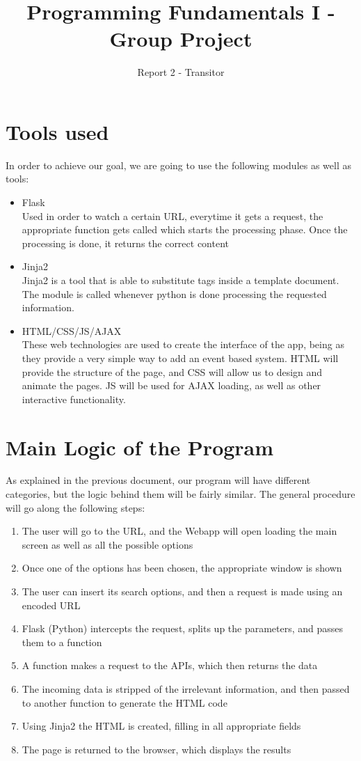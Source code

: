 \documentclass[a4paper]{article}
\title{Programming Fundamentals I - Group Project}
\author{Report 2 - Transitor}
\begin{document}
\maketitle
\section{Tools used}
In order to achieve our goal, we are going to use the following modules as well as tools:
\begin{itemize}
\item Flask\\
Used in order to watch a certain URL, everytime it gets a request, the appropriate function gets called which starts the processing phase. Once the processing is done, it returns the correct content
\item Jinja2\\
Jinja2 is a tool that is able to substitute tags inside a template document. The module is called whenever python is done processing the requested information.
\item HTML/CSS/JS/AJAX\\
These web technologies are used to create the interface of the app, being as they provide a very simple way to add an event based system. HTML will provide the structure of the page, and CSS will allow us to design and animate the pages. JS will be used for AJAX loading, as well as other interactive functionality. 
\end{itemize}


\section{Main Logic of the Program}
As explained in the previous document, our program will have different categories, but the logic behind them will be fairly similar. The general procedure will go along the following steps:
\begin{enumerate}
\item The user will go to the URL, and the Webapp will open loading the main screen as well as all the possible options
\item Once one of the options has been chosen, the appropriate window is shown
\item The user can insert its search options, and then a request is made using an encoded URL
\item Flask (Python) intercepts the request, splits up the parameters, and passes them to a function
\item A function makes a request to the APIs, which then returns the data
\item The incoming data is stripped of the irrelevant information, and then passed to another function to generate the HTML code
\item Using Jinja2 the HTML is created, filling in all appropriate fields
\item The page is returned to the browser, which displays the results
\end{enumerate}
\end{document}
